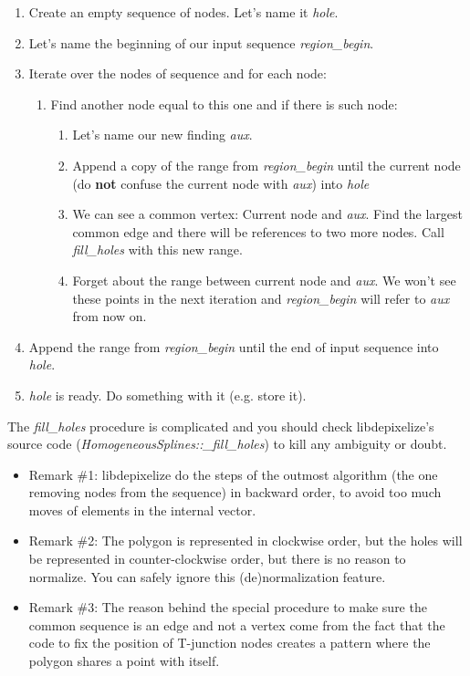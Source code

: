 \begin{enumerate}
\item Create an empty sequence of nodes. Let's name it \emph{hole}.
\item Let's name the beginning of our input sequence \emph{region\_begin}.
\item Iterate over the nodes of sequence and for each node:
  \begin{enumerate}
  \item Find another node equal to this one and if there is such node:
    \begin{enumerate}
    \item Let's name our new finding \emph{aux}.
    \item Append a copy of the range from \emph{region\_begin} until the current
      node (do \textbf{not} confuse the current node with \emph{aux}) into
      \emph{hole}
    \item We can see a common vertex: Current node and \emph{aux}. Find the
      largest common edge and there will be references to two more nodes. Call
      \emph{fill\_holes} with this new range.
    \item Forget about the range between current node and \emph{aux}. We won't
      see these points in the next iteration and \emph{region\_begin} will refer
      to \emph{aux} from now on.
    \end{enumerate}
  \end{enumerate}
\item Append the range from \emph{region\_begin} until the end of input
  sequence into \emph{hole}.
\item \emph{hole} is ready. Do something with it (e.g. store it).
\end{enumerate}

The \emph{fill\_holes} procedure is complicated and you should check
libdepixelize's source code (\emph{HomogeneousSplines::\_fill\_holes}) to kill
any ambiguity or doubt.

\begin{itemize}
\item Remark \#1: libdepixelize do the steps of the outmost algorithm (the one
  removing nodes from the sequence) in backward order, to avoid too much moves
  of elements in the internal vector.
\item Remark \#2: The polygon is represented in clockwise order, but the holes
  will be represented in counter-clockwise order, but there is no reason to
  normalize. You can safely ignore this (de)normalization feature.
\item Remark \#3: The reason behind the special procedure to make sure the
  common sequence is an edge and not a vertex come from the fact that the code
  to fix the position of   T-junction nodes creates a pattern where the polygon
  shares a point with itself.
\end{itemize}

